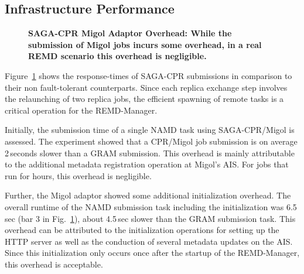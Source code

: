 \documentclass{rspublic}
\begin{document}
\subsection{Infrastructure Performance}
\begin{figure}[ht]
    \centering
    \caption{\footnotesize \bf SAGA-CPR Migol Adaptor Overhead: While the submission of Migol jobs incurs some overhead, in a real REMD scenario this overhead is negligible.}       
    \label{fig:performance_perf_submission}
\end{figure}           

Figure~\ref{fig:performance_perf_submission} shows the response-times
of SAGA-CPR submissions in comparison to their non fault-tolerant
counterparts. Since each replica exchange step involves the
relaunching of two replica jobs, the efficient spawning of remote
tasks is a critical operation for the REMD-Manager.

Initially, the submission time of a single NAMD task using
SAGA-CPR/Migol is assessed. The experiment showed that a CPR/Migol job
submission is on average 2\,seconds slower than a GRAM
submission. This overhead is mainly attributable to the additional
metadata registration operation at Migol's AIS. For jobs that run for 
hours, this overhead is negligible.

Further, the Migol adaptor showed some additional initialization
overhead. The overall runtime of the NAMD submission task including
the initialization was 6.5\,sec (bar 3 in
Fig.~\ref{fig:performance_perf_submission}), about 4.5\,sec slower
than the GRAM submission task. This overhead can be attributed to the
initialization operations for setting up the HTTP server as well as
the conduction of several metadata updates on the AIS. Since this
initialization only occurs once after the startup of the REMD-Manager,
this overhead is acceptable.
                                                                                                                    
\end{document}

